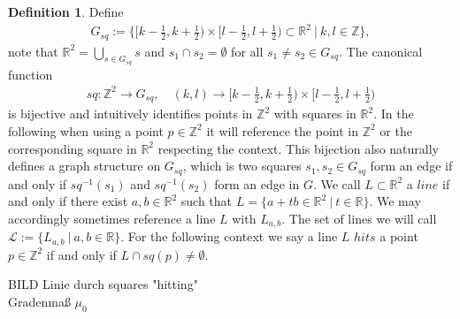 \documentclass[12pt,a4paper]{scrartcl}
\numberwithin{equation}{section}
\numberwithin{equation}{section}%
\theoremstyle{definition}
\newtheorem{definition}[theorem]{Definition}
\theoremstyle{definition}
\begin{document}
\begin{definition}
	Define 
	\begin{align}
		G_{sq} := \{[k - \frac{1}{2}, k + \frac{1}{2}) \times [l- \frac{1}{2}, l + \frac{1}{2}) \subset \mathbb{R}^2\ |\ k,l \in \mathbb{Z}\}, 
	\end{align} 
	note that $\mathbb{R}^2 = \bigcup_{s\in G_{sq}} s$ and $s_1\cap s_2 = \emptyset$ for all $s_1\neq s_2\in G_{sq}$. The canonical function
	\begin{align}
	sq: \mathbb{Z}^2 \to G_{sq},\quad (k,l)\to [k - \frac{1}{2}, k + \frac{1}{2}) \times [l- \frac{1}{2}, l + \frac{1}{2})
	\end{align}
	is bijective and intuitively identifies points in $\mathbb{Z}^2$ with squares in $\mathbb{R}^2$. In the following when using a point $p\in \mathbb{Z}^2$ it will reference the point in $\mathbb{Z}^2$ or the corresponding square in $\mathbb{R}^2$ respecting the context. This bijection also naturally defines a graph structure on $G_{sq}$, which is two squares $s_1, s_2\in G_{sq}$ form an edge if and only if $sq^{-1}(s_1)$ and $sq^{-1}(s_2)$ form an edge in $G$. We call $L\subset \mathbb{R}^2$ a $line$ if and only if there exist $a,b\in \mathbb{R}^2$ such that $L=\{a+tb\in \mathbb{R}^2\ |\ t\in \mathbb{R}\}$. We may accordingly sometimes reference a line $L$ with $L_{a,b}$. The set of lines we will call $\mathcal{L} := \{L_{a,b}\ |\ a,b\in \mathbb{R}\}$. For the following context we say a line $L$ $hits$ a point $p\in \mathbb{Z}^2$ if and only if $L\cap sq(p) \neq \emptyset$.
	
\end{definition}

BILD Linie durch squares "hitting"\\
Gradenmaß $\mu_0$
\end{document}
